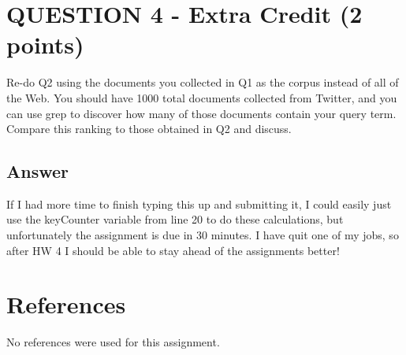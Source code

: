 \documentclass[12pt]{article}
\begin{document}
\section*{QUESTION 4 - Extra Credit (2 points)}
Re-do Q2 using the documents you collected in Q1 as the corpus instead of all of the Web. You should have 1000 total documents collected from Twitter, and you can use grep to discover how many of those documents contain your query term. Compare this ranking to those obtained in Q2 and discuss.

\subsection*{Answer}
If I had more time to finish typing this up and submitting it, I could easily just use the keyCounter variable from line 20 to do these calculations, but unfortunately the assignment is due in 30 minutes. I have quit one of my jobs, so after HW 4 I should be able to stay ahead of the assignments better!

\section*{References}
No references were used for this assignment.

\newpage

\end{document}
